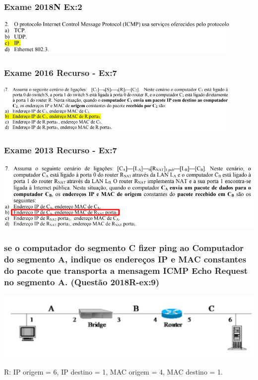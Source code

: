 \documentclass[../resumosRCOM.tex]{subfiles}
\begin{document}
\subsubsection{Exame 2018N Ex:2}
\begin{center}
    \includegraphics[width=12cm]{images/RCOM44.png}
\end{center}

\subsubsection{Exame 2016 Recurso - Ex:7}
\begin{center}            
    \includegraphics[width=12cm]{images/RCOM50.png}
\end{center}
\subsubsection{Exame 2013 Recurso - Ex:7}
\begin{center}            
    \includegraphics[width=14cm]{images/RCOM53.png}
\end{center}

\subsubsection{se o computador do segmento C fizer ping ao Computador do segmento A, indique os endereços IP e MAC constantes do pacote que transporta a mensagem ICMP Echo Request no segmento A. (Questão 2018R-ex:9)}
\begin{center}
    \includegraphics[width=15cm]{images/RCOM49.png}
\end{center}
R: IP origem = 6, IP destino = 1, MAC origem = 4, MAC destino = 1.\newline
\end{document}
